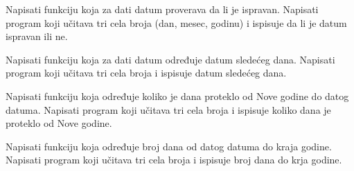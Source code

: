 \begin{Exercise}[label=p1.4_] 
Napisati funkciju 
koja za dati datum proverava da li je ispravan. Napisati program koji
učitava tri cela broja (dan, mesec, godinu) i ispisuje da li je datum
ispravan ili ne.

\end{Exercise}
\begin{Answer}[ref=p1.4_]
\end{Answer}


\begin{Exercise}[label=p1.4_] 
Napisati funkciju  koja za dati datum određuje datum sledećeg dana. Napisati
program koji učitava tri cela broja i ispisuje datum sledećeg dana. 

\end{Exercise}
\begin{Answer}[ref=p1.4_]
\end{Answer}

\begin{Exercise}[label=p1.4_] 
Napisati funkciju  koja određuje koliko je dana proteklo od Nove godine do
datog datuma. Napisati program koji učitava tri cela broja i ispisuje
koliko dana je proteklo od Nove godine.

\end{Exercise}
\begin{Answer}[ref=p1.4_]
\end{Answer}

\begin{Exercise}[label=p1.4_] 
Napisati funkciju  koja određuje broj dana od datog datuma do kraja
godine. Napisati program koji učitava tri cela broja i ispisuje broj
dana do krja godine.
 
\end{Exercise}
\begin{Answer}[ref=p1.4_]
\end{Answer}

